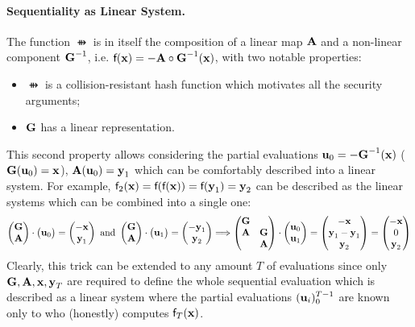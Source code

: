 \paragraph{Sequentiality as Linear System.}
The function $\ffun{}$ is in itself the composition of a linear map $\vA$ and a non-linear
component $\vGi$, i.e. $\ffun{\vx} = - \vA \circ \vGi(\vx)$, with two notable properties:
\begin{itemize}
	\item $\ffun{}$ is a collision-resistant hash function which motivates all the security arguments;
	\item $\vG$ has a linear representation.
\end{itemize}
%
This second property allows considering the partial evaluations $\vu[0] = -\vGi(\vx)$
($\vG(\vu[0]) = \vx$), $\vA(\vu[0]) = \vy[1]$ which can be comfortably described into a linear system.
For example, $\ffun[2]{\vx} = \ffun{\ffun{\vx}} = \ffun{\vy[1]} = \vy[2]$ can be described as the 
linear systems which can be combined into a single one:
\[
	\begin{pmatrix}
		\vG \\ \vA 
	\end{pmatrix}
	\cdot
	\begin{pmatrix}
		\vu[0] 
	\end{pmatrix}
	= 
	\begin{pmatrix}
		-\vx \\ \vy[1]
	\end{pmatrix}
	\text{ and }
		\begin{pmatrix}
		\vG \\ \vA 
	\end{pmatrix}
	\cdot
	\begin{pmatrix}
		\vu[1] 
	\end{pmatrix}
	= 
	\begin{pmatrix}
		-\vy[1] \\ \vy[2]
	\end{pmatrix}
	\Longrightarrow
	\begin{pmatrix}
		\vG & \\ \vA & \vG \\ & \vA
	\end{pmatrix}
	\cdot
	\begin{pmatrix}
		\vu[0] \\ \vu[1]
	\end{pmatrix}
	= 
	\begin{pmatrix}
		-\vx \\ \vy[1] - \vy[1] \\  \vy[2]
	\end{pmatrix}
	=
	\begin{pmatrix}
		-\vx \\ 0 \\  \vy[2]
	\end{pmatrix}
\]
%
Clearly, this trick can be extended to any amount $T$ of evaluations since only $\vG,\vA,\vx,\vy[T]$
are required to define the whole sequential evaluation which is described as a linear system where
the partial evaluations $(\vu[i])_{0}^{T-1}$ are known only to who (honestly) computes $\ffun[T]{\vx}$.




